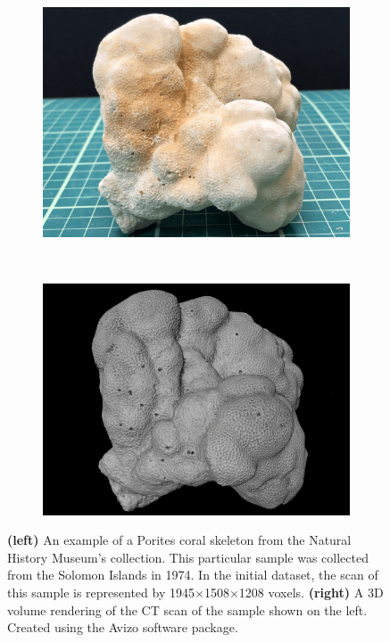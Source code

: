 \begin{figure}[!b]
    \centering
    \begin{subfigure}[t]{0.49\textwidth}
        \centering
        \includegraphics[width=1\textwidth, valign=c]{images/real-coral.png}
    \end{subfigure}
    ~
    \begin{subfigure}[t]{0.49\textwidth}
        \centering
        \includegraphics[width=1\textwidth, valign=c]{images/3D-scan.png}
    \end{subfigure}
    \caption{\textbf{(left)} An example of a Porites coral skeleton from the Natural History Museum's collection. This particular sample was collected from the Solomon Islands in 1974. In the initial dataset, the scan of this sample is represented by 1945$\times$1508$\times$1208 voxels. \textbf{(right)} A 3D volume rendering of the CT scan of the sample shown on the left. Created using the Avizo software package.}
    \label{fig:scanexample}
\end{figure}

